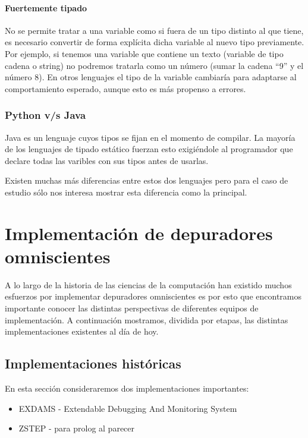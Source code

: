 \documentclass[12pt,legalpaper]{report}
\begin{document}
			\subsubsection{Fuertemente tipado}

No se permite tratar a una variable como si fuera de un tipo distinto al que tiene, es necesario convertir de forma explícita dicha variable al nuevo tipo previamente. Por ejemplo, si tenemos una variable que contiene un texto (variable de tipo cadena o string) no podremos tratarla como un número (sumar la cadena “9” y el número 8). En otros lenguajes el tipo de la variable cambiaría para adaptarse al comportamiento esperado, aunque esto es más propenso a errores.

		\subsection{Python v/s Java}

Java es un lenguaje cuyos tipos se fijan en el momento de compilar. La mayoría de los lenguajes de tipado estático fuerzan esto exigiéndole al programador que declare todas las varibles con sus tipos antes de usarlas. 

Existen muchas más diferencias entre estos dos lenguajes pero para el caso de estudio sólo nos interesa mostrar esta diferencia como la principal.

\chapter{Implementación de depuradores omniscientes}

A lo largo de la historia de las ciencias de la computación han existido muchos esfuerzos por implementar depuradores omniscientes es por esto que encontramos importante conocer las distintas perspectivas de diferentes equipos de implementación.  A continuación mostramos, dividida por etapas, las distintas implementaciones existentes al día de hoy.

	\section{Implementaciones históricas}

En esta sección consideraremos dos implementaciones importantes:
\begin{itemize}
	\item EXDAMS - Extendable Debugging And Monitoring System
	\item ZSTEP - para prolog al parecer
\end{itemize}
\end{document}
